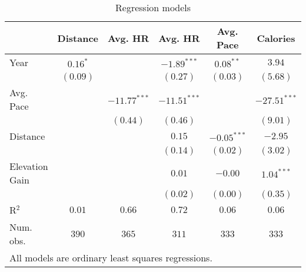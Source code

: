 
\begin{table}
\caption{Regression models}
\begin{center}
\begin{tabular}{l c c c c c}
\hline
 & Distance & Avg. HR & Avg. HR & Avg. Pace & Calories \\
\hline
Year           & $0.16^{*}$ &                & $-1.89^{***}$  & $0.08^{**}$   & $3.94$         \\
               & $(0.09)$   &                & $(0.27)$       & $(0.03)$      & $(5.68)$       \\
Avg. Pace      &            & $-11.77^{***}$ & $-11.51^{***}$ &               & $-27.51^{***}$ \\
               &            & $(0.44)$       & $(0.46)$       &               & $(9.01)$       \\
Distance       &            &                & $0.15$         & $-0.05^{***}$ & $-2.95$        \\
               &            &                & $(0.14)$       & $(0.02)$      & $(3.02)$       \\
Elevation Gain &            &                & $0.01$         & $-0.00$       & $1.04^{***}$   \\
               &            &                & $(0.02)$       & $(0.00)$      & $(0.35)$       \\
\hline
R$^2$          & $0.01$     & $0.66$         & $0.72$         & $0.06$        & $0.06$         \\
Num. obs.      & $390$      & $365$          & $311$          & $333$         & $333$          \\
\hline
\multicolumn{6}{l}{\scriptsize{All models are ordinary least squares regressions.}}
\end{tabular}
\label{table:coefficients}
\end{center}
\end{table}
